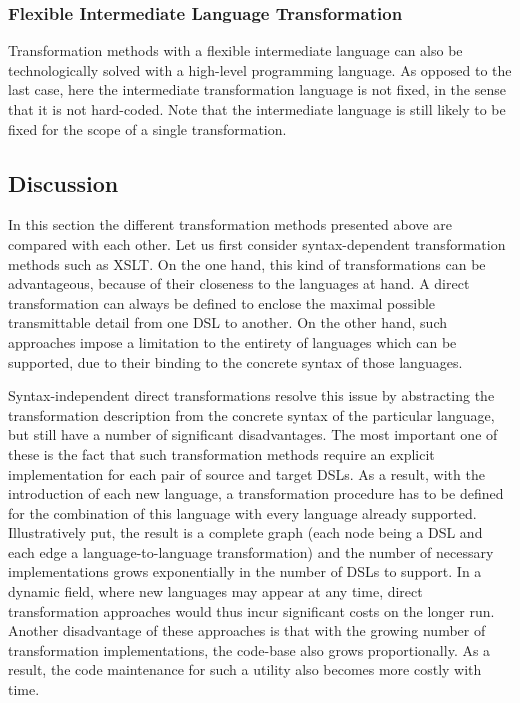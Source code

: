 \subsubsection{Flexible Intermediate Language Transformation}

Transformation methods with a flexible intermediate language can also be technologically solved with a high-level programming language. As opposed to the last case, here the intermediate transformation language is not fixed, in the sense that it is not hard-coded. Note that the intermediate language is still likely to be fixed for the scope of a single transformation.

\subsection{Discussion}

In this section the different transformation methods presented above are compared with each other. Let us first consider syntax-dependent transformation methods such as XSLT. On the one hand, this kind of transformations can be advantageous, because of their closeness to the languages at hand. A direct transformation can always be defined to enclose the maximal possible transmittable detail from one DSL to another. On the other hand, such approaches impose a limitation to the entirety of languages which can be supported, due to their binding to the concrete syntax of those languages.

Syntax-independent direct transformations resolve this issue by abstracting the transformation description from the concrete syntax of the particular language, but still have a number of significant disadvantages. The most important one of these is the fact that such transformation methods require an explicit implementation for each pair of source and target DSLs. As a result, with the introduction of each new language, a transformation procedure has to be defined for the combination of this language with every language already supported. Illustratively put, the result is a complete graph (each node being a DSL and each edge a language-to-language transformation) and the number of necessary implementations grows exponentially in the number of DSLs to support. In a dynamic field, where new languages may appear at any time, direct transformation approaches would thus incur significant costs on the longer run. Another disadvantage of these approaches is that with the growing number of transformation implementations, the code-base also grows proportionally. As a result, the code maintenance for such a utility also becomes more costly with time. 

